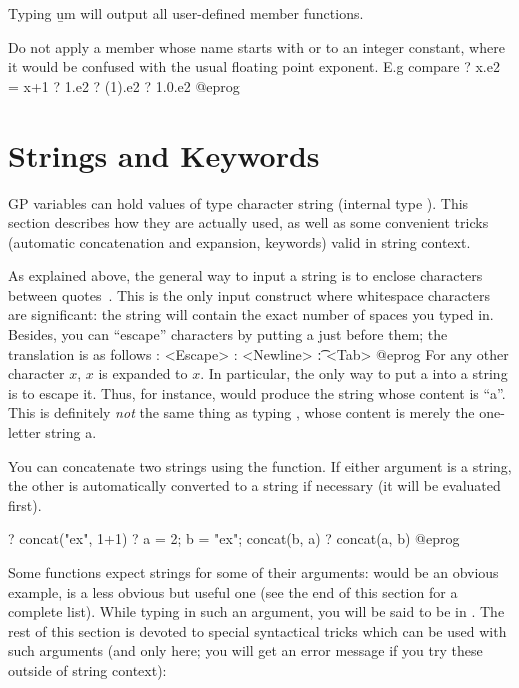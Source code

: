  Typing \b{um} will output all user-defined member functions.

 Do not apply a member whose name starts with
 or  to an integer constant, where it would be confused with
the usual floating point exponent. E.g compare
\bprog
  ? x.e2 = x+1
  ? 1.e2
  ? (1).e2
  ? 1.0.e2
@eprog

\section{Strings and Keywords}
\label{se:strings}

 GP variables can hold values of type character string
(internal type ). This section describes how they are actually used,
as well as some convenient tricks (automatic concatenation and expansion,
keywords) valid in string context.

As explained above, the general way to input a string is to enclose
characters between quotes~. This is the only input construct where
whitespace characters are significant: the string will contain the exact
number of spaces you typed in. Besides, you can ``escape'' characters by
putting a \kbd{\bs} just before them; the translation is as follows
\bprog
   \e: <Escape>
   \n: <Newline>
   \t: <Tab>
@eprog
For any other character $x$, \b{$x$} is expanded to $x$. In particular, the
only way to put a  into a string is to escape it. Thus, for
instance,  would produce the string whose content is
``a''. This is definitely \emph{not} the same thing as typing ,
whose content is merely the one-letter string a.

You can concatenate two strings using the  function. If either
argument is a string, the other is automatically converted to a string if
necessary (it will be evaluated first).

\bprog
? concat("ex", 1+1)
? a = 2; b = "ex"; concat(b, a)
? concat(a, b)
@eprog

Some functions expect strings for some of their arguments:  would
be an obvious example,  is a less obvious but useful one (see the
end of this section for a complete list). While typing in such an argument,
you will be said to be in . The rest of this section is
devoted to special syntactical tricks which can be used with such arguments
(and only here; you will get an error message if you try these outside of
string context):

